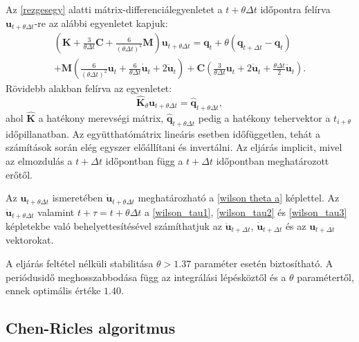 Az \eqref{rezgesegy} alatti mátrix-differenciálegyenletet a $t+\theta\Delta{t}$ időpontra felírva $\mathbf{u}_{t+\theta\Delta{t}}$-re az alábbi egyenletet kapjuk:
\begin{equation}
\begin{split}
\label{wilson long}
\left(\mathbf{K}+\frac{3}{\theta\Delta{t}}\mathbf{C}+\frac{6}{(\theta\Delta{t})^2}\mathbf{M}\right)\mathbf{u}_{t+\theta\Delta{t}} = \mathbf{q}_t+\theta\left(\mathbf{q}_{t+\Delta{t}}-\mathbf{q}_t\right)\\+\mathbf{M}\left(\frac{6}{(\theta\Delta{t})^2}\mathbf{u}_t+\frac{6}{\theta\Delta{t}}\mathbf{\dot{u}}_t+2\mathbf{\ddot{u}}_t\right)+\mathbf{C}\left(\frac{3}{\theta\Delta{t}}\mathbf{u}_t+2\mathbf{\dot{u}}_t+\frac{\theta\Delta{t}}{2} \mathbf{\ddot{u}}_t\right).
\end{split}
\end{equation}
Rövidebb alakban felírva az egyenletet:
\begin{equation}
\label{wilson short}
\mathbf{\hat{K}}_{\theta}\mathbf{u}_{t+\theta\Delta{t}} = \mathbf{\hat{q}}_{t+\theta\Delta{t}},
\end{equation}
ahol  $\mathbf{\hat{K}}$ a hatékony merevségi mátrix, $\mathbf{\hat{q}}_{t+\theta\Delta{t}}$ pedig a hatékony tehervektor a $t_{i+\theta}$ időpillanatban. Az együtthatómátrix lineáris esetben időfüggetlen, tehát a számítások során elég egyszer előállítani és invertálni. Az eljárás implicit, mivel az elmozdulás a $t+\Delta{t}$ időpontban  függ a $t+\Delta{t}$ időpontban meghatározott erőtől.

Az $\mathbf{u}_{t+\theta\Delta{t}}$ ismeretében $\mathbf{\ddot{u}}_{t+\theta\Delta{t}}$ meghatározható a \eqref{wilson theta a} képlettel. Az $\mathbf{\ddot{u}}_{t+\theta\Delta{t}}$ valamint $t+\tau = t+\theta\Delta{t}$  a \eqref{wilson_tau1}, \eqref{wilson_tau2} és \eqref{wilson_tau3} képletekbe való behelyettesítésével számíthatjuk az $\mathbf{\ddot{u}}_{t+\Delta{t}}$, $\mathbf{\dot{u}}_{t+\Delta{t}}$ és az $\mathbf{u}_{t+\Delta{t}}$ vektorokat.

A eljárás feltétel nélküli stabilitása $\theta>1.37$ paraméter esetén biztosítható. A periódusidő meghosszabbodása függ az integrálási lépésköztől és a $\theta$ paramétertől, ennek optimális értéke  $1.40$.


\subsection{Chen-Ricles algoritmus}\label{subsec:cr}

